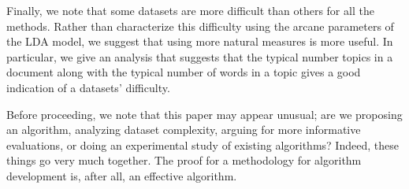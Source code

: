 Finally, we note that some datasets are more difficult than others for
all the methods.  Rather than characterize this difficulty using the
arcane parameters of the LDA model, we suggest that using more natural
measures is more useful.  In particular, we give an analysis that
suggests that the typical number topics in a document along with the
typical number of words in a topic gives a good indication of a
datasets' difficulty.  

Before proceeding, we note that this paper may appear unusual; are we
proposing an algorithm, analyzing dataset complexity, arguing for more
informative evaluations, or doing an experimental study of existing
algorithms?  Indeed, these things go very much together.  The proof
for a methodology for algorithm development is, after all, an
effective algorithm.


